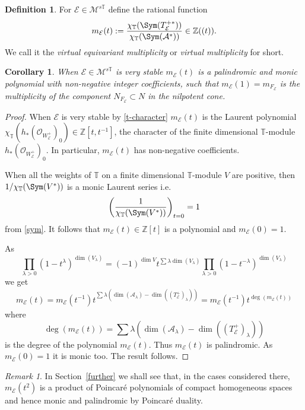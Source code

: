 \documentclass[12pt]{article}
\numberwithin{equation}{section}
\newtheorem{corollary}[theorem]{Corollary}
\theoremstyle{remark}
\newtheorem{remark}[theorem]{Remark}
\theoremstyle{definition}
\newtheorem{definition}[theorem]{Definition}
\numberwithin{theorem}{section}
\def\beq{\begin{eqnarray}}
\def\eeq{\end{eqnarray}}
\def\calE{{\mathcal E}}
\def\M{{\mathcal{M}}}
\def\calA{{\mathcal{A}}}
\newcommand{\T}{{\mathbb{T}}}
\def\calO{{\mathcal O}}
\def\Z{\mathbb{Z}}
\renewcommand{\1}{\mathbbm{1}}
\begin{document}
\begin{definition}\label{equmult} For $\calE\in \M^{s
		\T}$ define the rational function $$m_{\calE}(t):={{ \chi_\T(\Sym(T^{+*}_\calE))\over \chi_\T(\Sym(\calA^*))}}\in \Z((t)).$$ %
	We call it the {\em virtual equivariant multiplicity} or {\em virtual multiplicity} for short. 
\end{definition}

\begin{corollary}\label{eqmult}
	When $\calE\in \M^{s
		\T}$ is very stable $m_{\calE}(t)$ is a palindromic and monic polynomial with non-negative integer coefficients, such that $m_{\calE}(1)=m_{F_\calE}$ is the multiplicity of the component $N_{F_\calE}\subset N$ in the nilpotent cone.
\end{corollary}
\begin{proof}
	When $\calE$ is very stable  by \eqref{t-character} $m_{\calE}(t)$ is the Laurent polynomial $\chi_\T(h_*(\calO_{W^+_\calE})_0)\in \Z[t,t^{-1}]$, the character of the finite dimensional $\T$-module $h_*(\calO_{W^+_\calE})_0$. In particular, $m_{\calE}(t)$ has non-negative coefficients.  
	
	When all the weights of $\T$ on a finite dimensional $\T$-module $V$ are positive, then ${1/ \chi_{\T}(\Sym(V^*))}$ is a monic Laurent series i.e. $$\left({1\over \chi_{\T}(\Sym(V^*))}\right)_{t=0}=1$$ from \eqref{sym}. It follows that $m_{\calE}(t)\in \Z[t]$ is a polynomial and $m_{\calE}(0)=1$. 
	
	As  $$\prod_{\lambda>0}{( 1- t^{\lambda})^{\dim(V_\lambda)}}=(-1)^{\dim V}t^{\sum \lambda\dim(V_\lambda)} \prod_{\lambda>0}{( 1- t^{-\lambda})^{\dim(V_\lambda)}}$$ we get  \beq\label{palindromic}m_{\calE}(t)=m_{\calE}(t^{-1}) t^{\sum \lambda\left(\dim(\calA_\lambda)-\dim((T^+_\calE)_\lambda)\right)}=m_{\calE}(t^{-1}) t^{\deg(m_{\calE}(t))}
	\eeq where $$\deg(m_{\calE}(t))=\sum \lambda\left(\dim(\calA_\lambda)-\dim((T^+_\calE)_\lambda)\right)$$ is the degree of the polynomial $m_{\calE}(t)$. Thus $m_{\calE}(t)$ is palindromic.  As $m_{\calE}(0)=1$  it is monic too. The result follows.   
\end{proof}

\begin{remark} In Section~\ref{further} we shall see that, in the cases considered there, $m_{\calE}(t^2)$ is a product of Poincar\'e polynomials of compact homogeneous spaces and hence monic and palindromic by Poincar\'e duality. 
\end{remark} 
\end{document}
